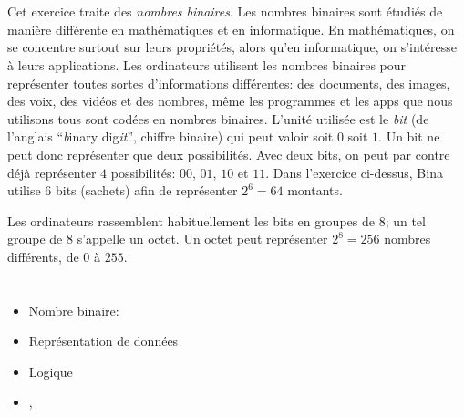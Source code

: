 {{%
\section*{\BrochureItsInformatics}
Cet exercice traite des \emph{nombres binaires}. Les nombres binaires sont étudiés de manière différente en mathématiques et en informatique. En mathématiques, on se concentre surtout sur leurs propriétés, alors qu’en informatique, on s’intéresse à leurs applications. Les ordinateurs utilisent les nombres binaires pour représenter toutes sortes d’informations différentes: des documents, des images, des voix, des vidéos et des nombres, même les programmes et les apps que nous utilisons tous sont codées en nombres binaires. L’unité utilisée est le \emph{bit} (de l’anglais “\emph{b}inary dig\emph{it}”, chiffre binaire) qui peut valoir soit $0$ soit $1$. Un bit ne peut donc représenter que deux possibilités. Avec deux bits, on peut par contre déjà représenter $4$ possibilités: $00$, $01$, $10$ et $11$. Dans l’exercice ci-dessus, Bina utilise $6$ bits (sachets) afin de représenter ${2^6 = 64}$ montants.

Les ordinateurs rassemblent habituellement les bits en groupes de $8$; un tel groupe de $8$ s’appelle un octet. Un octet peut représenter ${2^8 = 256}$ nombres différents, de $0$ à $255$.



\section*{\BrochureWebsitesAndKeywords}
{\raggedright
\begin{itemize}
  \item Nombre binaire: \href{https://fr.wikipedia.org/wiki/Code_binaire}{}
  \item Représentation de données
  \item Logique
  \item \href{https://fr.wikipedia.org/wiki/Bit}{}, \href{https://fr.wikipedia.org/wiki/Octet}{}
\end{itemize}


}

}{}

\def\AuthorDjazbiA{} %
\def\AuthorMohebbiH{} %
\def\AuthorFreiF{} %
\def\AuthorVanicekJ{} %
\def\AuthorDatzkoS{} %
\def\AuthorPelletE{} %

\newpage}{}
